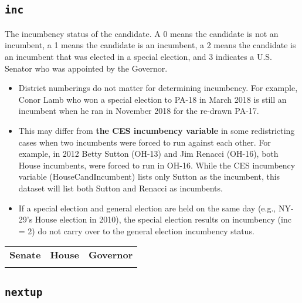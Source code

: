 \documentclass[12pt]{article}
\begin{document}
\twocolumn
\begin{adjustwidth}{-2em}{-2em}
\centering
{\scriptsize

}
\end{adjustwidth}

\onecolumn



\subsection*{\texttt{inc}}

The incumbency status of the candidate. A 0 means the candidate is not an incumbent, a 1 means the candidate is an incumbent, a 2 means the candidate is an incumbent that was elected in a special election, and 3 indicates a U.S. Senator who was appointed by the Governor.
\begin{itemize}
\item District numberings do not matter for determining incumbency. For example, Conor Lamb who won a special election to PA-18 in March 2018 is still an incumbent when he ran in November 2018 for the re-drawn PA-17.
\item This may differ from \textbf{the CES incumbency variable} in some redistricting cases when two incumbents were forced to run against each other. For example, in 2012 Betty Sutton (OH-13) and Jim Renacci (OH-16), both House incumbents, were forced to run in OH-16. While the CES incumbency variable (HouseCandIncumbent) lists only Sutton as the incumbent, this dataset will list both Sutton and Renacci as incumbents.
\item If a special election and general election are held on the same day (e.g., NY-29's House election in 2010), the special election results on incumbency (inc = 2) do not carry over to the general election incumbency status.
\end{itemize}

    \begin{tabularx}{\linewidth}{CCC}
    \textbf{Senate} & \textbf{House} & \textbf{Governor}\\
     &  & 
    \end{tabularx}


\FloatBarrier


\subsection*{\texttt{nextup}}
\end{document}
